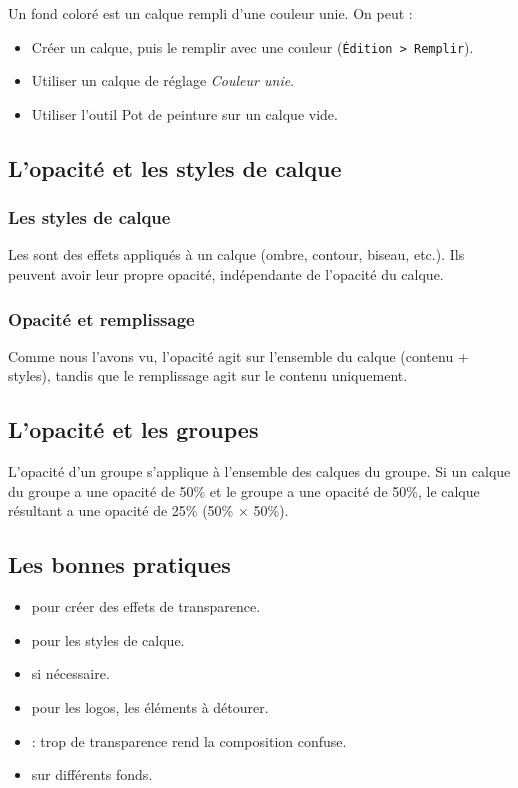 Un fond coloré est un calque rempli d'une couleur unie. On peut :

\begin{itemize}
    \item Créer un calque, puis le remplir avec une couleur (\texttt{Édition > Remplir}).
    \item Utiliser un calque de réglage \emph{Couleur unie}.
    \item Utiliser l'outil Pot de peinture sur un calque vide.
\end{itemize}

\subsection{L'opacité et les styles de calque}

\subsubsection{Les styles de calque}

Les  sont des effets appliqués à un calque (ombre, contour, biseau, etc.). Ils peuvent avoir leur propre opacité, indépendante de l'opacité du calque.

\subsubsection{Opacité et remplissage}

Comme nous l'avons vu, l'opacité agit sur l'ensemble du calque (contenu + styles), tandis que le remplissage agit sur le contenu uniquement.

\subsection{L'opacité et les groupes}

L'opacité d'un groupe s'applique à l'ensemble des calques du groupe. Si un calque du groupe a une opacité de 50\% et le groupe a une opacité de 50\%, le calque résultant a une opacité de 25\% (50\% × 50\%).

\subsection{Les bonnes pratiques}

\begin{itemize}
    \item {} pour créer des effets de transparence.
    \item {} pour les styles de calque.
    \item {} si nécessaire.
    \item {} pour les logos, les éléments à détourer.
    \item {} : trop de transparence rend la composition confuse.
    \item {} sur différents fonds.
\end{itemize}

